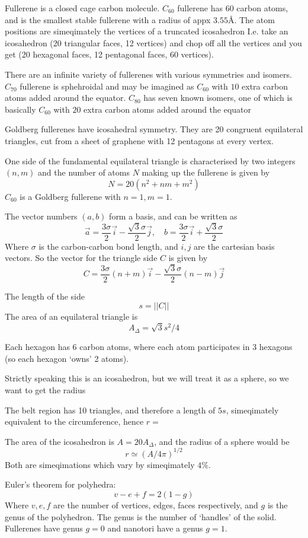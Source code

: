 \documentclass{E:/Documents/Latex/myassignment}
\begin{document}
Fullerene is a closed cage carbon molecule. $C_{60}$ fullerene has 60 carbon atoms, and is the smallest stable fullerene with a radius of appx $3.55$\AA. The atom positions are simeqimately the vertices of a truncated icosahedron I.e. take an icosahedron (20 triangular faces, 12 vertices) and chop off all the vertices and you get (20 hexagonal faces, 12 pentagonal faces, 60 vertices).

There are an infinite variety of fullerenes with various symmetries and isomers. $C_{70}$ fullerene is sphehroidal and may be imagined as $C_{60}$ with $10$ extra carbon atoms added around the equator. $C_{80}$ has seven known isomers, one of which is basically $C_{60}$ with $20$ extra carbon atoms added around the equator

Goldberg fullerenes have icosahedral symmetry.
They are 20 congruent equilateral triangles, cut from a sheet of graphene with 12 pentagons at every vertex.

One side of the fundamental equilateral triangle is characterised by two integers $(n,m)$ and the number of atoms $N$ making up the fullerene is given by
\[N = 20 (n^2 + nm + m^2)\]
$C_{60}$ is a Goldberg fullerene with $n=1,m=1$.

The vector numbers $(a,b)$ form a basis, and can be written as
\[\vec a = \frac{3\sigma}{2} \vec i - \frac{\sqrt{3}\sigma}{2} \vec j , \quad b =\frac{3\sigma}{2} \vec i + \frac{\sqrt{3}\sigma}{2}  \]
Where $\sigma$ is the carbon-carbon bond length, and $i,j$ are the cartesian basis vectors. So the vector for the triangle side $C$ is given by
\[C = \frac{3\sigma}{2}(n+m) \vec i - \frac{\sqrt{3}\sigma}{2} (n-m)\vec j\]

The length of the side 
\[s = ||C||\]
The area of an equilateral triangle is 
\[A_{\Delta} = \sqrt{3} s^2/4\]

Each hexagon has 6 carbon atoms, where each atom participates in 3 hexagons (so each hexagon `owns' 2 atoms).

Strictly speaking this is an icosahedron, but we will treat it as a sphere, so we want to get the radius

The belt region has 10 triangles, and therefore a length of $5s$, simeqimately equivalent to the circumference, hence $r = $

The area of the icosahedron is $A = 20 A_{\Delta}$, and the radius of a sphere would be
\[r \simeq (A/4\pi)^{1/2}\]
Both are simeqimations which vary by simeqimately $4\%$.


Euler's theorem for polyhedra:
\[v-e+f = 2(1-g)\]
Where $v,e,f$ are the number of vertices, edges, faces respectively, and $g$ is the genus of the polyhedron. The genus is the number of `handles' of the solid. Fullerenes have genus $g=0$ and nanotori have a genus $g=1$. 
\end{document}

